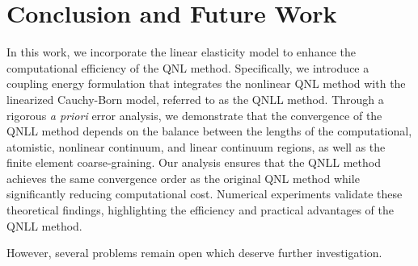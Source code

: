 \section{Conclusion and Future Work}
\label{sec: conclusion}

In this work, we incorporate the linear elasticity model to enhance the computational efficiency of the QNL method. Specifically, we introduce a coupling energy formulation that integrates the nonlinear QNL method with the linearized Cauchy-Born model, referred to as the QNLL method. Through a rigorous {\it a priori} error analysis, we demonstrate that the convergence of the QNLL method depends on the balance between the lengths of the computational, atomistic, nonlinear continuum, and linear continuum regions, as well as the finite element coarse-graining. Our analysis ensures that the QNLL method achieves the same convergence order as the original QNL method while significantly reducing computational cost. Numerical experiments validate these theoretical findings, highlighting the efficiency and practical advantages of the QNLL method.

However, several problems remain open which deserve further investigation.


